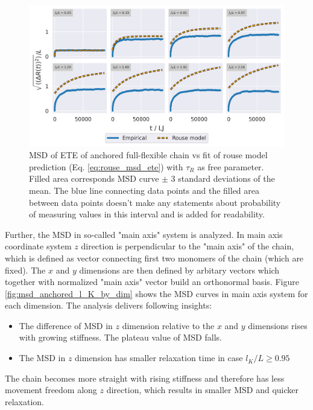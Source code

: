 \documentclass[
    paper=A4,pagesize=automedia,fontsize=12pt,
    BCOR=15mm,DIV=22,
    twoside,headinclude,footinclude=false,
    ngerman,fleqn,             %
    bibliography=totocnumbered,          %
    listof=totoc,                %
    listof=flat,                 %
    cleardoublepage=empty      %
    numbers=endperiod
]{scrartcl}
\begin{document}
\begin{figure}[h]
    \begin{center}
      \includegraphics[width=\columnwidth,trim={0cm 0cm 0cm 0.0cm},clip]{4-exp-delta_R-rouse_anal.png}
      \caption{\label{fig:msd_anchored_l_K_rouse_fit_anal}
      MSD of ETE of anchored full-flexible chain vs fit of rouse model prediction 
      (Eq. \ref{eq:rouse_msd_ete}) with $\tau_R$ as free parameter.
      Filled area corresponds MSD curve $\pm$ 3 standard deviations of the mean. The
      blue line connecting data points and the filled area between data points doesn't make
      any statements about probability of measuring values in this interval and is
      added for readability.
      }
    \end{center}
\end{figure}

Further, the MSD in so-called "main axis" system is analyzed. In main axis coordinate
system $z$ direction is perpendicular to the "main axis" of the chain, which is defined
as vector connecting first two monomers of the chain (which are fixed). 
The $x$ and $y$ dimensions are then defined by arbitary vectors which 
together with normalized "main axis" vector build an orthonormal basis.
Figure \ref{fig:msd_anchored_l_K_by_dim} shows the MSD curves in main axis system
for each dimension. The analysis delivers following insights:
\begin{itemize}
    \item The difference of MSD in $z$ dimension relative to the $x$ and $y$
    dimensions rises with growing stiffness. The plateau value of MSD falls.
    \item The MSD in $z$ dimension has smaller relaxation time in case $l_K/L \ge 0.95$ 
\end{itemize}
The chain becomes more straight with rising stiffness and therefore has less
movement freedom along $z$ direction, which results in smaller MSD and quicker
relaxation.
\end{document}
